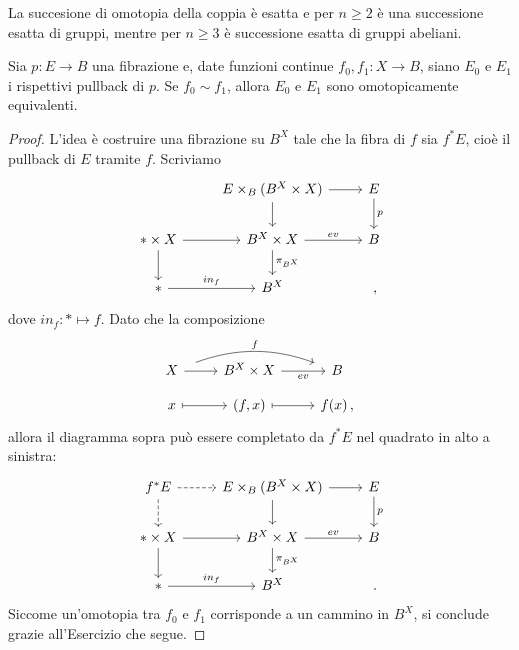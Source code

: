 \begin{cor}
	La succesione di omotopia della coppia è esatta
	e per $n \ge 2$ è una successione esatta di gruppi,
	mentre per $n \ge 3$ è successione esatta di gruppi abeliani.
\end{cor}

\begin{prop}
	Sia $p:E \to B$ una fibrazione e,
	date funzioni continue
	$f_{0},f_{1}: X \to B$,
	siano $E_{0}$ e $E_{1}$ i rispettivi
	pullback di $p$.
	Se $f_{0} \sim f_{1}$, allora $E_{0}$ e $E_{1}$ sono
	omotopicamente equivalenti.
	\begin{proof}
		L'idea è costruire una fibrazione su $B^{X}$ 
		tale che la fibra di $f$ sia $f^{*}E$,
		cioè il pullback di $E$ tramite $f$.
		Scriviamo
		\begin{equation*}
			\begin{tikzcd}
				& E \times_{B} (B^{X} \times X) \ar[r] \ar[d]
				& E \ar[d, "p"] \\
				\ast \times X \ar[r] \ar[d] 
				& B^{X} \times X \ar[r, "ev"] \ar[d, "\pi_{B^{X}}"] & B \\
				\ast \ar[r, "in_{f}"] & B^{X} & \,,
			\end{tikzcd}
		\end{equation*}
		dove $in_{f}: \ast \mapsto f$. Dato che la composizione
		\begin{equation*}
			\begin{tikzcd}[row sep=small]
				X \ar[r] \ar[rr, bend left=20, "f", shorten=2ex] 
				& B^{X} \times X \ar[r, "ev"'] & B \\
				x \ar[r, mapsto] 
				& (f,x) \ar[r, mapsto] & f(x)\,,
			\end{tikzcd}
		\end{equation*}
		allora il diagramma sopra può essere completato da $f^*E$
		nel quadrato in alto a sinistra:
		\begin{equation*}
			\begin{tikzcd}
				f^*E \ar[d, dashed] \ar[r, dashed] 
				& E \times_{B} (B^{X} \times X) \ar[r] \ar[d]
				& E \ar[d, "p"] \\
				\ast \times X \ar[r] \ar[d] 
				& B^{X} \times X \ar[r, "ev"] \ar[d, "\pi_{B^{X}}"] & B \\
				\ast \ar[r, "in_{f}"] & B^{X} & \,.
			\end{tikzcd}
		\end{equation*}
		Siccome un'omotopia tra $f_{0}$ e $f_{1}$ 
		corrisponde a un cammino in $B^{X}$,
		si conclude grazie all'Esercizio che segue.
	\end{proof}
\end{prop}

